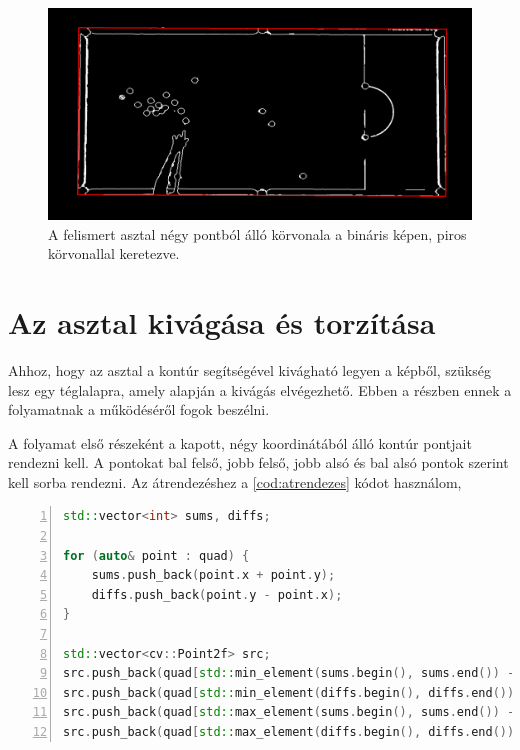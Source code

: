\begin{figure}[!ht]
    \centering
    \includegraphics[width=140mm, keepaspectratio]{figures/input_screen_quad.png}
    \caption{A felismert asztal négy pontból álló körvonala a bináris képen, piros körvonallal keretezve.}
    \label{fig:bemeneti_kep_quad}
\end{figure}

\section{Az asztal kivágása és torzítása}
Ahhoz, hogy az asztal a kontúr segítségével kivágható legyen a képből, szükség lesz egy téglalapra, amely alapján a kivágás elvégezhető. Ebben a részben ennek a folyamatnak a működéséről fogok beszélni.
\par A folyamat első részeként a kapott, négy koordinátából álló kontúr pontjait rendezni kell. A pontokat bal felső, jobb felső, jobb alsó és bal alsó pontok szerint kell sorba rendezni.
\newline Az átrendezéshez a \ref{cod:atrendezes} kódot használom,

\begin{codewrapper}
\begin{lstlisting}[language=C++, numbers=left, caption={Átrendező algoritmus.}, label={cod:atrendezes}]
std::vector<int> sums, diffs;

for (auto& point : quad) {
    sums.push_back(point.x + point.y);
    diffs.push_back(point.y - point.x);
}

std::vector<cv::Point2f> src;
src.push_back(quad[std::min_element(sums.begin(), sums.end()) - sums.begin()]);
src.push_back(quad[std::min_element(diffs.begin(), diffs.end()) - diffs.begin()]);
src.push_back(quad[std::max_element(sums.begin(), sums.end()) - sums.begin()]);
src.push_back(quad[std::max_element(diffs.begin(), diffs.end()) - diffs.begin()]);
\end{lstlisting}
\end{codewrapper}

